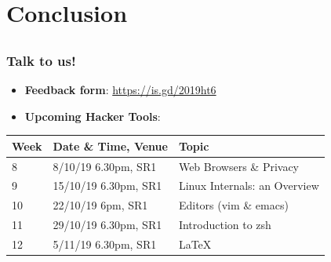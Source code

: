 \documentclass[12pt]{beamer}
\begin{document}
\section{Conclusion}
\subsection{}
\begin{frame}
  \frametitle{Talk to us!}
  \begin{itemize}
    \item \textbf{Feedback form}: \url{https://is.gd/2019ht6}
    \item \textbf{Upcoming Hacker Tools}:
  \end{itemize}
  \begin{tabularx}{\textwidth}{l|l|X}
    \textbf{Week} & \textbf{Date \& Time, Venue} & \textbf{Topic}               \\ \hline
    8             & 8/10/19 6.30pm, SR1          & Web Browsers \& Privacy      \\ \hline
    9             & 15/10/19 6.30pm, SR1         & Linux Internals: an Overview \\ \hline
    10            & 22/10/19 6pm, SR1            & Editors (vim \& emacs)       \\ \hline
    11            & 29/10/19 6.30pm, SR1         & Introduction to zsh          \\ \hline
    12            & 5/11/19 6.30pm, SR1          & \LaTeX                       \\ \hline
  \end{tabularx}
\end{frame}
\end{document}
